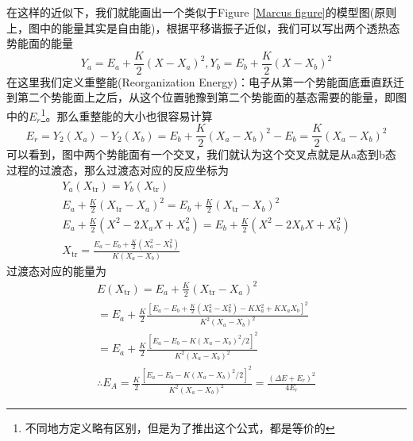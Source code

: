 \documentclass[12pt,a4paper,openany,twoside]{book}
\numberwithin{equation}{section}
\begin{document}
        在这样的近似下，我们就能画出一个类似于Figure \ref{Marcus figure}的模型图(原则上，图中的能量其实是自由能)，根据平移谐振子近似，我们可以写出两个透热态势能面的能量
        \begin{equation*}
          Y_{a}=E_{a}+\frac{K}{2}\left(X-X_{a}\right)^{2}, Y_{b}=E_{b}+\frac{K}{2}\left(X-X_{b}\right)^{2}
        \end{equation*}
        在这里我们定义重整能(Reorganization Energy)：电子从第一个势能面底垂直跃迁到第二个势能面上之后，从这个位置驰豫到第二个势能面的基态需要的能量，即图中的$E_r$\footnote{不同地方定义略有区别，但是为了推出这个公式，都是等价的}。那么重整能的大小也很容易计算
        \begin{equation*}
          E_{r}=Y_{2}\left(X_{a}\right)-Y_{2}\left(X_{b}\right)=E_{b}+\frac{K}{2}\left(X_{a}-X_{b}\right)^{2}-E_{b}=\frac{K}{2}\left(X_{a}-X_{b}\right)^{2}
        \end{equation*}
        可以看到，图中两个势能面有一个交叉，我们就认为这个交叉点就是从a态到b态过程的过渡态，那么过渡态对应的反应坐标为
        \begin{equation*}
          \begin{array}{c}
            {Y_{a}\left(X_{\mathrm{tr}}\right)=Y_{b}\left(X_{\mathrm{tr}}\right)} \\
            {E_{a}+\frac{K}{2}\left(X_{\mathrm{tr}}-X_{a}\right)^{2}=E_{b}+\frac{K}{2}\left(X_{\mathrm{tr}}-X_{b}\right)^{2}} \\
            {E_{a}+\frac{K}{2}\left(X^{2}-2 X_{a} X+X_{a}^{2}\right)=E_{b}+\frac{K}{2}\left(X^{2}-2 X_{b} X+X_{b}^{2}\right)} \\
            {X_{\mathrm{tr}}=\frac{E_{a}-E_{b}+\frac{K}{2}\left(X_{a}^{2}-X_{b}^{2}\right)}{K\left(X_{a}-X_{b}\right)}}
          \end{array}
        \end{equation*}
        过渡态对应的能量为
        \begin{equation*}
          \begin{array}{l}
            {E\left(X_{\mathrm{tr}}\right)=E_{a}+\frac{K}{2}\left(X_{\mathrm{tr}}-X_{a}\right)^{2}} \\
            {=E_{a}+\frac{K}{2} \frac{\left[E_{a}-E_{b}+\frac{K}{2}\left(X_{a}^{2}-X_{b}^{2}\right)-K X_{a}^{2}+K X_{a} X_{b}\right]^{2}}{K^{2}\left(X_{a}-X_{b}\right)^{2}}} \\
            {=E_{a}+\frac{K}{2} \frac{\left[E_{a}-E_{b}-K\left(X_{a}-X_{b}\right)^{2} / 2\right]^{2}}{K^{2}\left(X_{a}-X_{b}\right)^{2}}} \\
            {\therefore E_{A}=\frac{K}{2} \frac{\left[E_{a}-E_{b}-K\left(X_{a}-X_{b}\right)^{2} / 2\right]^{2}}{K^{2}\left(X_{a}-X_{b}\right)^{2}}=\frac{\left(\Delta E+E_{r}\right)^{2}}{4 E_{r}}}
          \end{array}
        \end{equation*}
\end{document}
